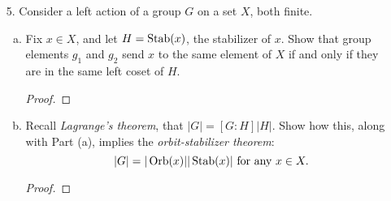\begin{itemize}
\begin{enumerate}[(a)]
\begin{proof}
    \end{proof}
    
    \item Show that if $|H| = m$ and $H$ is the only subgroup of $G$ of order $m$, then $H$ is normal in $G$.
    \begin{proof}

    \end{proof}
    
    \item Is the converse to the previous part true (that is, if $H$ is of order $m$ and normal in $G$, is it true that $H$ is the only subgroup of $G$ of order $m$)? Prove this or give a counterexample.
    \begin{proof}

    \end{proof}
    
    \item Suppose that $H$ is a subgroup of $A_n$, $n \geq 5$ with $|H| = m$, and $1 < m < \frac{n!}{2}$. Show that there are at least $n$ subgroups of $A_n$ of order $m$.
    \begin{proof}

    \end{proof}
\end{enumerate}








\item[5.] Consider a left action of a group $G$ on a set $X$, both finite.

\begin{enumerate}[(a)]
    \item Fix $x \in X$, and let $H = \operatorname{Stab}(x)$, the stabilizer of $x$. Show that group elements $g_1$ and $g_2$ send $x$ to the same element of $X$ if and only if they are in the same left coset of $H$.
    \begin{proof}

    \end{proof}
    
    \item Recall \textit{Lagrange’s theorem}, that $|G| = [G : H]|H|$. Show how this, along with Part (a), implies the \textit{orbit-stabilizer theorem}:
    $$|G| = |\operatorname{Orb}(x)||\operatorname{Stab}(x)| \text{ for any } x \in X.$$
    \begin{proof}

    \end{proof}
    

\end{enumerate}
\end{itemize}
